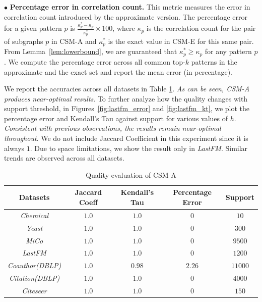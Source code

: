 $\bullet$ \textbf{Percentage error in correlation count.} This metric measures the error in correlation count introduced by the approximate version. The percentage error for a given pattern $p$ is $\frac{\kappa^*_p-\kappa_p}{\kappa^*_p}\times 100$, where $\kappa_p$ is the correlation count for the pair of subgraphs $p$ in {\sf CSM-A} and $\kappa^*_p$ is the exact value in CSM-E for this same pair. From Lemma~\ref{lem:lowerbound}, we are guaranteed that $\kappa^*_p\geq\kappa_p$ for any pattern $p$. We compute the  percentage error across all common top-$k$ patterns in the approximate and the exact set and report the mean error (in percentage).

 We report the accuracies across all datasets in Table \ref{tab:quality}. %
{\em As can be seen, {\sf CSM-A} produces near-optimal results}. %
To further analyze how the quality changes with support threshold, in Figures~\ref{fig:lastfm_error} and \ref{fig:lastfm_kt}, we plot the percentage error and Kendall's Tau against support for various values of $h$. {\em Consistent with previous observations, the results remain near-optimal throughout}. %
We do not include Jaccard Coefficient in this experiment since it is always $1$. Due to space limitations, we show the result only in {\em LastFM}. Similar trends are observed across all datasets. %
%
\begin{table}[tb!]
	\begin{center}
		\centering
		\caption{Quality evaluation of CSM-A\label{tab:quality}}
{\scriptsize
		\begin{tabular} {ccccc}
			\hline
			Datasets  & Jaccard Coeff & Kendall's Tau  & Percentage Error & Support\\			
			\hline
			{\em Chemical}   &   $1.0$   &  $1.0$   & $0$ & $10$\\
			{\em Yeast}   &   $1.0$    &  $1.0$  & $0$ & $300$\\
			{\em MiCo}   &   $1.0$    &  $1.0$   & $0$ & $9500$\\
			{\em LastFM}   &  $1.0$   &  $1.0$ & $0$ & $1200$\\
			{\em Coauthor(DBLP)}   &   $1.0$  &  $0.98$  & $2.26$ & $11000$\\
			{\em Citation(DBLP)}   &   $1.0$   &  $1.0$   & $0$ & $4000$\\
			{\em Citeseer}   &   $1.0$   &  $1.0$ & $0$ & $150$\\
			
			\hline
		\end{tabular}}
	\end{center}
	\vspace{-1mm}
\end{table}
